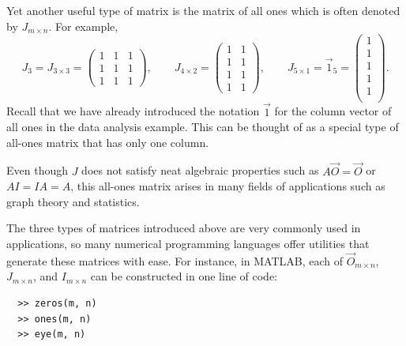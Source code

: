 \documentclass{ximera}
\begin{document}
Yet another useful type of matrix is the matrix of all ones which is
often denoted by $J_{m \times n}$. For example,
\[
  J_{3} = J_{3 \times 3} =
  \begin{pmatrix}
    1 & 1 & 1 \\
    1 & 1 & 1 \\
    1 & 1 & 1
  \end{pmatrix}, \qquad
  J_{4 \times 2} =
  \begin{pmatrix}
    1 & 1 \\
    1 & 1 \\
    1 & 1 \\
    1 & 1
  \end{pmatrix}, \qquad
  J_{5 \times 1} = \vec{1}_5 =
  \begin{pmatrix}
    1 \\ 1 \\ 1 \\ 1 \\ 1 \\
  \end{pmatrix}.
\]
Recall that we have already introduced the notation $\vec{1}$ for the
column vector of all ones in the data analysis example. This can be
thought of as a special type of all-ones matrix that has only one
column.

Even though $J$ does not satisfy neat algebraic properties such as
$A \vec{O} = \vec{O}$ or $AI = IA = A$, this all-ones matrix arises in
many fields of applications such as graph theory and statistics.

\begin{remark}
  The three types of matrices introduced above are very commonly used
  in applications, so many numerical programming languages offer
  utilities that generate these matrices with ease. For instance, in
  MATLAB, each of $\vec{O}_{m \times n}$, $J_{m \times n}$, and $I_{m \times n}$ can be
  constructed in one line of code:
\begin{verbatim}
  >> zeros(m, n)
  >> ones(m, n)
  >> eye(m, n)
\end{verbatim}
\end{remark}
\end{document}
